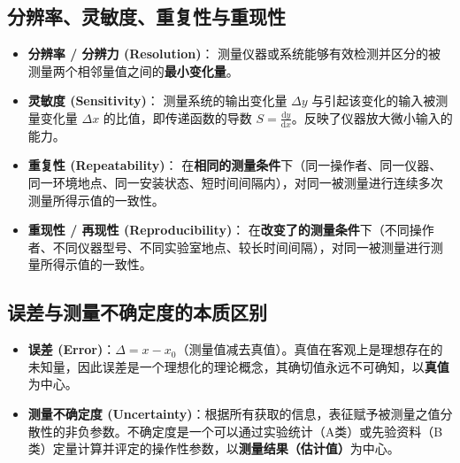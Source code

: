 \documentclass[11pt,a4paper]{ctexart}
\begin{document}
\subsection{分辨率、灵敏度、重复性与重现性}
\begin{itemize}[leftmargin=1.5em, itemsep=4pt]
    \item \textbf{分辨率 / 分辨力 (Resolution)}：
    测量仪器或系统能够有效检测并区分的被测量两个相邻量值之间的\textbf{最小变化量}。
    
    \item \textbf{灵敏度 (Sensitivity)}：
    测量系统的输出变化量 $\Delta y$ 与引起该变化的输入被测量变化量 $\Delta x$ 的比值，即传递函数的导数 $S = \frac{\mathrm{d}y}{\mathrm{d}x}$。反映了仪器放大微小输入的能力。
    
    \item \textbf{重复性 (Repeatability)}：
    在\textbf{相同的测量条件}下（同一操作者、同一仪器、同一环境地点、同一安装状态、短时间间隔内），对同一被测量进行连续多次测量所得示值的一致性。
    
    \item \textbf{重现性 / 再现性 (Reproducibility)}：
    在\textbf{改变了的测量条件}下（不同操作者、不同仪器型号、不同实验室地点、较长时间间隔），对同一被测量进行测量所得示值的一致性。
\end{itemize}

\subsection{误差与测量不确定度的本质区别}
\begin{itemize}[leftmargin=1.5em, itemsep=3pt]
    \item \textbf{误差 (Error)}：$\Delta = x - x_0$（测量值减去真值）。真值在客观上是理想存在的未知量，因此误差是一个理想化的理论概念，其确切值永远不可确知，以\textbf{真值}为中心。
    \item \textbf{测量不确定度 (Uncertainty)}：根据所有获取的信息，表征赋予被测量之值分散性的非负参数。不确定度是一个可以通过实验统计（A类）或先验资料（B类）定量计算并评定的操作性参数，以\textbf{测量结果（估计值）}为中心。
\end{itemize}
\end{document}
